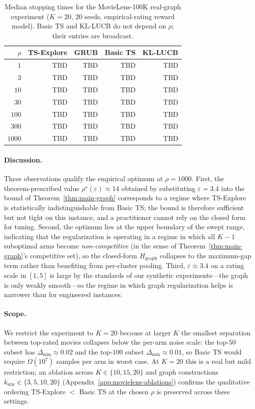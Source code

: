 \begin{table}[ht]
\centering
\small
\begin{tabular}{rrrrr}
\toprule
$\rho$ & TS-Explore & GRUB & Basic TS & KL-LUCB \\
\midrule
$1$    & TBD & TBD & TBD & TBD \\
$3$    & TBD & TBD & TBD & TBD \\
$10$   & TBD & TBD & TBD & TBD \\
$30$   & TBD & TBD & TBD & TBD \\
$100$  & TBD & TBD & TBD & TBD \\
$300$  & TBD & TBD & TBD & TBD \\
$1000$ & TBD & TBD & TBD & TBD \\
\bottomrule
\end{tabular}
\caption{Median stopping times for the MovieLens-100K real-graph experiment ($K=20$, $20$ seeds, empirical-rating reward model). Basic TS and KL-LUCB do not depend on $\rho$; their entries are broadcast.}
\label{tab:movielens}
\end{table}

\paragraph{Discussion.}
Three observations qualify the empirical optimum at $\rho=1000$. First, the theorem-prescribed value $\rho^\star(\varepsilon)\approx 14$ obtained by substituting $\varepsilon=3.4$ into the bound of Theorem~\ref{thm:main-graph} corresponds to a regime where TS-Explore is statistically indistinguishable from Basic TS; the bound is therefore sufficient but not tight on this instance, and a practitioner cannot rely on the closed form for tuning. Second, the optimum lies at the upper boundary of the swept range, indicating that the regularization is operating in a regime in which all $K-1$ suboptimal arms become \emph{non-competitive} (in the sense of Theorem~\ref{thm:main-graph}'s competitive set), so the closed-form $H_{\mathrm{graph}}$ collapses to the maximum-gap term rather than benefiting from per-cluster pooling. Third, $\varepsilon\approx 3.4$ on a rating scale in $[1,5]$ is large by the standards of our synthetic experiments---the graph is only weakly smooth---so the regime in which graph regularization helps is narrower than for engineered instances.

\paragraph{Scope.}
We restrict the experiment to $K=20$ because at larger $K$ the smallest separation between top-rated movies collapses below the per-arm noise scale: the top-$50$ subset has $\Delta_{\min}\approx 0.02$ and the top-$100$ subset $\Delta_{\min}\approx 0.01$, so Basic TS would require $\Omega(10^7)$ samples per arm in worst case. At $K=20$ this is a real but mild restriction; an ablation across $K\in\{10,15,20\}$ and graph constructions $k_{\mathrm{nbr}}\in\{3,5,10,20\}$ (Appendix~\ref{app:movielens-ablations}) confirms the qualitative ordering TS-Explore $<$ Basic TS at the chosen $\rho$ is preserved across these settings.

